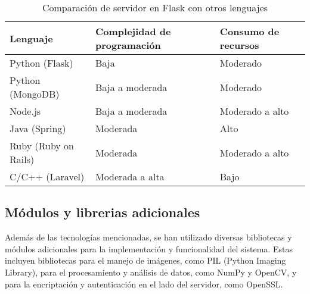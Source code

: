 \begin{table}[h]
\centering
\caption{Comparación de servidor en Flask con otros lenguajes}
\label{tabla:comparacion-servidor}
\begin{tabular}{|l|l|l|}
\hline
\textbf{Lenguaje}    & \textbf{Complejidad de programación} & \textbf{Consumo de recursos}  \\ \hline
Python (Flask)       & Baja                                 & Moderado                      \\ \hline
Python (MongoDB)     & Baja a moderada                      & Moderado                      \\ \hline
Node.js              & Baja a moderada                      & Moderado a alto               \\ \hline
Java (Spring)        & Moderada                             & Alto                          \\ \hline
Ruby (Ruby on Rails) & Moderada                             & Moderado a alto               \\ \hline
C/C++ (Laravel)      & Moderada a alta                      & Bajo                          \\ \hline
\end{tabular}
\end{table}


\subsection{Módulos y librerias adicionales}
Además de las tecnologías mencionadas, se han utilizado diversas bibliotecas y módulos adicionales para la implementación y funcionalidad del sistema. Estas incluyen bibliotecas para el manejo de imágenes, como PIL (Python Imaging Library), para el procesamiento y análisis de datos, como NumPy y OpenCV, y para la encriptación y autenticación en el lado del servidor, como OpenSSL.

